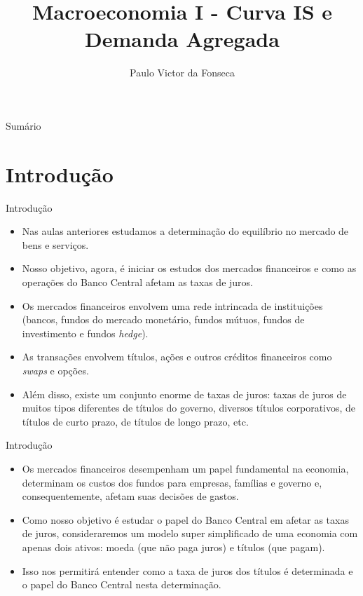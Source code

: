 \documentclass[10pt]{beamer}
\title[]{Macroeconomia I - Curva IS e Demanda Agregada}
\author[]{Paulo Victor da Fonseca}
\date{}
\begin{document}
\begin{frame}[plain]
\end{frame}

\begin{frame}{Sumário}
    \tableofcontents
\end{frame}

\section{Introdução}
\begin{frame}{Introdução}
    \begin{itemize}
        \item Nas aulas anteriores estudamos a determinação do equilíbrio no mercado de bens e serviços.
        \bigskip
        \item Nosso objetivo, agora, é iniciar os estudos dos mercados financeiros e como as operações do Banco Central afetam as taxas de juros.
        \bigskip
        \item Os mercados financeiros envolvem uma rede intrincada de instituições (bancos, fundos do mercado monetário, fundos mútuos, fundos de investimento e fundos \emph{hedge}).
        \bigskip
        \item As transações envolvem títulos, ações e outros créditos financeiros como \emph{swaps} e opções.
        \bigskip
        \item Além disso, existe um conjunto enorme de taxas de juros: taxas de juros de muitos tipos diferentes de títulos do governo, diversos títulos corporativos, de títulos de curto prazo, de títulos de longo prazo, etc.
    \end{itemize}
\end{frame}

\begin{frame}{Introdução}
    \begin{itemize}
        \item Os mercados financeiros desempenham um papel fundamental na economia, determinam os custos dos fundos para empresas, famílias e governo e, consequentemente, afetam suas decisões de gastos.
        \bigskip
        \item Como nosso objetivo é estudar o papel do Banco Central em afetar as taxas de juros, consideraremos um modelo super simplificado de uma economia com apenas dois ativos: moeda (que não paga juros) e títulos (que pagam).
        \bigskip
        \item Isso nos permitirá entender como a taxa de juros dos títulos é determinada e o papel do Banco Central nesta determinação.
    \end{itemize}
\end{frame}
\end{document}
